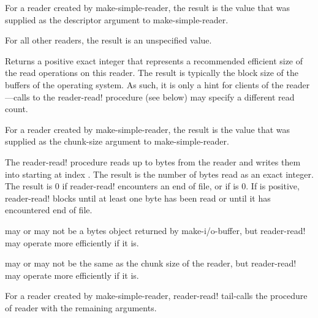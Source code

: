 \begin{entry}{%
}
   
For a reader created by {\cf make-simple-reader}, the result is the value that was
supplied as the descriptor argument to {\cf make-simple-reader}.
   
For all other readers, the result is an unspecified value.
\end{entry}

\begin{entry}{%
}
   
Returns a positive exact integer that represents a recommended
efficient size of the read operations on this reader. The result is typically the
block size of the buffers of the operating system. As such, it is only a
hint for clients of the reader---calls to the {\cf reader-read!} procedure (see
below) may specify a different read count.

For a reader created by {\cf make-simple-reader}, the result is the
value that was supplied as the chunk-size argument to {\cf
  make-simple-reader}.
\end{entry}

\begin{entry}{%
}
   
 The {\cf reader-read!} procedure 
reads up to  bytes from the reader and writes them into
 starting at index
.  The result is the number of bytes read
as an exact integer. The result is 0 if {\cf reader-read!} encounters an end of file, or
if  is 0.  If  is positive, {\cf reader-read!}
blocks until at least one byte has been
read or until it has encountered end of file.
   
 may or may not be a bytes object returned by {\cf
  make-i/o-buffer}, but {\cf reader-read!} may operate
more efficiently if it is.
   
 may or may not be the same as the chunk size of the
reader, but {\cf reader-read!} may operate more
efficiently if it is.
   
For a reader created by {\cf make-simple-reader}, {\cf reader-read!}
tail-calls the  procedure of reader with the remaining
arguments.
\end{entry}


